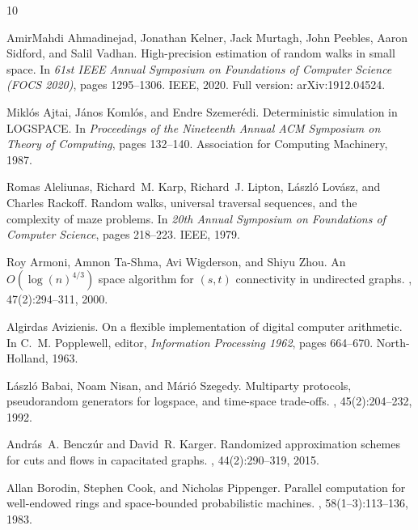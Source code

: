 \documentclass[11pt]{article}
\numberwithin{equation}{section}
\theoremstyle{definition}
\theoremstyle{remark}
\begin{document}
\begin{thebibliography}{10}

AmirMahdi Ahmadinejad, Jonathan Kelner, Jack Murtagh, John Peebles, Aaron
  Sidford, and Salil Vadhan.
\newblock High-precision estimation of random walks in small space.
\newblock In {\em 61st IEEE Annual Symposium on Foundations of Computer Science
  (FOCS 2020)}, pages 1295--1306. IEEE, 2020.
\newblock Full version: arXiv:1912.04524.

Mikl{\'o}s Ajtai, J{\'a}nos Koml{\'o}s, and Endre Szemer{\'e}di.
\newblock Deterministic simulation in {LOGSPACE}.
\newblock In {\em Proceedings of the Nineteenth Annual ACM Symposium on Theory
  of Computing}, pages 132--140. Association for Computing Machinery, 1987.

Romas Aleliunas, Richard~M. Karp, Richard~J. Lipton, L{\'a}szl{\'o} Lov{\'a}sz,
  and Charles Rackoff.
\newblock Random walks, universal traversal sequences, and the complexity of
  maze problems.
\newblock In {\em 20th Annual Symposium on Foundations of Computer Science},
  pages 218--223. IEEE, 1979.

Roy Armoni, Amnon Ta-Shma, Avi Wigderson, and Shiyu Zhou.
\newblock An {$O(\log(n)^{4/3})$} space algorithm for {$(s,t)$} connectivity in
  undirected graphs.
, 47(2):294--311, 2000.

Algirdas Avizienis.
\newblock On a flexible implementation of digital computer arithmetic.
\newblock In C.~M. Popplewell, editor, {\em Information Processing 1962}, pages
  664--670. North-Holland, 1963.

L{\'a}szl{\'o} Babai, Noam Nisan, and M{\'a}ri{\'o} Szegedy.
\newblock Multiparty protocols, pseudorandom generators for logspace, and
  time-space trade-offs.
, 45(2):204--232, 1992.

Andr{\'a}s~A. Bencz{\'u}r and David~R. Karger.
\newblock Randomized approximation schemes for cuts and flows in capacitated
  graphs.
, 44(2):290--319, 2015.

Allan Borodin, Stephen Cook, and Nicholas Pippenger.
\newblock Parallel computation for well-endowed rings and space-bounded
  probabilistic machines.
, 58(1--3):113--136, 1983.


\end{thebibliography}
\end{document}
